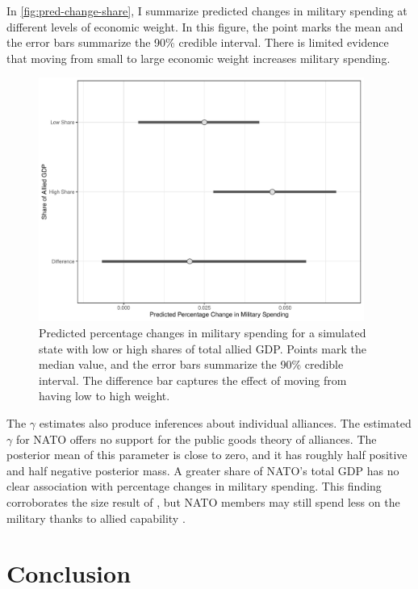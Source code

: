 \documentclass[12pt]{article}
\begin{document}
In \autoref{fig:pred-change-share}, I summarize predicted changes in military spending at different levels of economic weight. 
In this figure, the point marks the mean and the error bars summarize the 90\% credible interval. 
There is limited evidence that moving from small to large economic weight increases military spending. 

\begin{figure}[htbp]
	\centering
		\includegraphics[width=0.95\textwidth]{pred-change-share.pdf}
	\caption{Predicted percentage changes in military spending for a simulated state with low or high shares of total allied GDP. Points mark the median value, and the error bars summarize the 90\% credible interval. The difference bar captures the effect of moving from having low to high weight.}
	\label{fig:pred-change-share}
\end{figure}


The $\gamma$ estimates also produce inferences about individual alliances.
The estimated $\gamma$ for NATO offers no support for the public goods theory of alliances. 
The posterior mean of this parameter is close to zero, and it has roughly half positive and half negative posterior mass.  
A greater share of NATO's total GDP has no clear association with percentage changes in military spending. 
This finding corroborates the size result of \citet{PluemperNeumayer2015}, but NATO members may still spend less on the military thanks to allied capability \citep{GeorgeSandler2017}.


\section{Conclusion}
\end{document}
